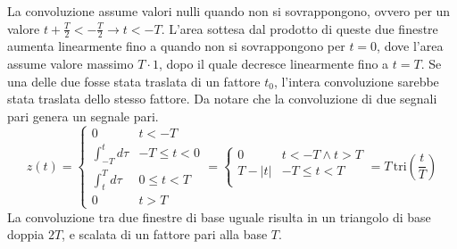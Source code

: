 \documentclass{article}
\numberwithin{equation}{subsection}
\begin{document}
La convoluzione assume valori nulli quando non si sovrappongono, ovvero per un valore $t+\displaystyle\frac{T}{2}<-\frac{T}{2}\to t<-T$. L'area sottesa dal prodotto 
di queste due finestre aumenta linearmente fino a quando non si sovrappongono per $t=0$, dove l'area assume valore massimo $T\cdot 1$, dopo il quale 
decresce linearmente fino a $t=T$. Se una delle due fosse stata traslata di un fattore $t_0$, l'intera convoluzione sarebbe stata traslata dello stesso fattore. Da notare 
che la convoluzione di due segnali pari genera un segnale pari.  
\begin{equation*}
    z(t)=\begin{cases}
        0&t<-T\\
        \displaystyle\int_{-T}^td\tau&-T\leq t<0\\
        \displaystyle\int_t^Td\tau&0\leq t<T\\
        0&t>T
    \end{cases}=\begin{cases}
        0&t<-T\land t>T\\
        T-|t|&-T\leq t<T\\
    \end{cases}=T\,\mbox{tri}\left(\displaystyle\frac{t}{T}\right)
\end{equation*}
La convoluzione tra due finestre di base uguale risulta in un triangolo di base doppia $2T$, e scalata di un fattore pari alla base $T$. 

\begin{center}
\end{center}
\end{document}
